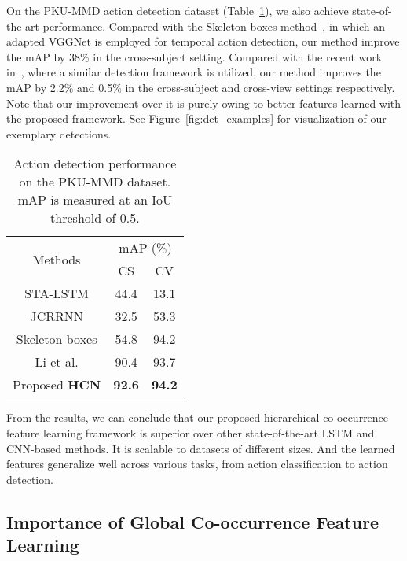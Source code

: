 \documentclass{article}
\begin{document}
On the PKU-MMD action detection dataset (Table~\ref{table:PKU}), we also achieve state-of-the-art performance. Compared with the Skeleton boxes method~\cite{libo}, in which an adapted VGGNet is employed for temporal action detection, our method improve the mAP by 38\% in the cross-subject setting. Compared with the recent work in~\cite{Li_2017_ICMEW}, where a similar detection framework is utilized, our method improves the mAP by 2.2\% and 0.5\% in the cross-subject and cross-view settings respectively. Note that our improvement over it is purely owing to better features learned with the proposed framework. See Figure~\ref{fig:det_examples} for visualization of our exemplary detections.

\begin{table}[tbp]
  \centering
  \begin{tabular}{c|cc}\hline
    \multirow{2}{*}{Methods} & \multicolumn{2}{c}{mAP (\%)} \\
    & CS & CV \\ \hline
    STA-LSTM \cite{song2016end} &44.4 &13.1 \\
    JCRRNN \cite{li2016online} &32.5 &53.3 \\
    Skeleton boxes \cite{libo}  &54.8 &94.2 \\
    Li et al. \cite{Li_2017_ICMEW} &90.4 &93.7 \\
    Proposed \textbf{HCN}  &\textbf{92.6} &\textbf{94.2} \\
    \hline
  \end{tabular}
\caption{Action detection performance on the PKU-MMD dataset. mAP is measured at an IoU threshold of 0.5.}
  \label{table:PKU}
\end{table}

From the results, we can conclude that our proposed hierarchical co-occurrence feature learning framework is superior over other state-of-the-art LSTM and CNN-based methods. It is scalable to datasets of different sizes. And the learned features generalize well across various tasks, from action classification to action detection.

\subsection{Importance of Global Co-occurrence Feature Learning}
\end{document}
